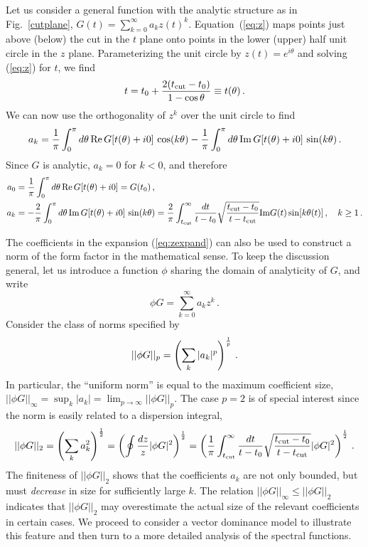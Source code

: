 \documentclass[12pt]{article}
\newcommand{\be}{\begin{equation}}
\newcommand{\ee}{\end{equation}}
\begin{document}
Let us consider a general function with the analytic structure as in Fig.~\ref{cutplane},
$G(t)=\sum_{k=0}^\infty a_k z(t)^k$. Equation~(\ref{eq:z}) maps points
just above (below) the cut in the $t$ plane onto points in the lower
(upper) half unit circle in the $z$ plane. Parameterizing the unit
circle by $z(t)=e^{i\theta}$ and solving (\ref{eq:z}) for $t$, we find
\be
t=t_0+\frac{2(t_{\rm cut}-t_0)}{1-\cos \theta}\equiv t(\theta)\,. 
\ee  
We can now use the orthogonality of $z^k$ over the unit circle to find 
\be
a_k=\frac{1}{\pi}\int_0^\pi d\theta\,{\rm Re}\, G[ t(\theta)+i0]\,\cos(k\theta)-
\frac{1}{\pi}\int_0^\pi d\theta\,  {\rm Im}\, G[t(\theta)+i0 ] \,\sin(k\theta) \,.
\ee
Since $G$ is analytic, $a_k=0$ for $k<0$, and therefore 
\begin{align}\label{eq:fourier} 
a_0&=\frac{1}{\pi}\int_0^\pi d\theta\,{\rm Re}\, G[ t(\theta)+i0]=G(t_0) \,,
\nonumber\\
a_k&=-\frac{2}{\pi}\int_0^\pi d\theta\,  {\rm Im}\, G[t(\theta)+i0 ] \,\sin(k\theta) 
= {2\over \pi} \int_{t_{\rm cut}}^\infty {dt\over t-t_0} \sqrt{ t_{\rm cut} - t_0 \over t - t_{\rm cut}} 
{\rm Im}G(t)
\sin[ k\theta(t) ] 
\,,\quad k\ge 1\,.
\end{align}

The coefficients in the expansion (\ref{eq:zexpand}) can also be used to 
construct a norm of the form factor in the mathematical sense.   
To keep the discussion general, let us introduce a function $\phi$ 
sharing the domain of analyticity of $G$, and write 
\be\label{eq:phizexpand}
 \phi G = \sum_{k=0}^\infty a_k z^k \,.
\ee
Consider the class of norms specified by 
\be
||\phi G||_{p} = \left( \sum_k |a_k|^{p} \right)^{1\over p} \,. 
\ee
In particular, the ``uniform norm'' is equal to the maximum coefficient size,
$|| \phi G ||_\infty = \sup_{k} {|a_k|}  = \lim_{p\to \infty} ||\phi G||_{p}$. 
The case $p=2$ is  of special interest since the norm is easily related to a dispersion integral, 
\be\label{eq:norm2}
||\phi G||_{2} = \left( \sum_k a_k^2 \right)^\frac12 = \left( \oint {dz\over z} |\phi G|^2 \right)^\frac12
= \left( 
{1\over \pi} \int_{t_{\rm cut}}^\infty {dt \over t-t_0} \sqrt{ t_{\rm cut} - t_0 \over t - t_{\rm cut} } |\phi G|^2 
\right)^\frac12 
\,.
\ee
The finiteness of $||\phi G||_2$ shows that the coefficients $a_k$ are not only bounded, 
but must {\it decrease} in size for sufficiently large $k$.   
The relation $||\phi G||_{\infty} \le ||\phi G||_2$ indicates that $||\phi G||_2$ may overestimate the 
actual size of the relevant coefficients in certain cases.  We proceed to consider a vector 
dominance model to illustrate this feature and then turn to a more detailed analysis 
of the spectral functions.  
\end{document}
